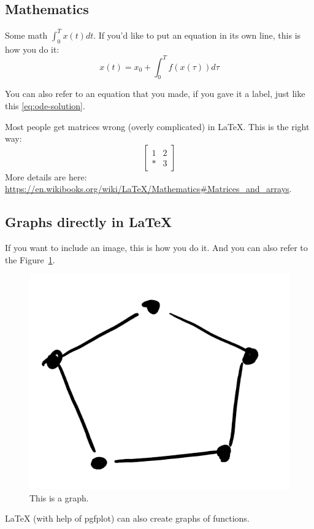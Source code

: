 \documentclass{amsart}
\begin{document}
\subsection{Mathematics}
Some math $\int_0^Tx(t)dt$. If you'd like to put an equation in its own line, this is how you do it:
\begin{equation}
x(t) = x_0 + \int_0^T f(x(\tau))d\tau  \label{eq:ode-solution}
\end{equation}


You can also refer to an equation that you made, if you gave it a label, just like this \eqref{eq:ode-solution}.


Most people get matrices wrong (overly complicated) in \LaTeX. This is the right way:
\[ %
  \begin{bmatrix}
    1 & 2 \\
    \ast & 3
  \end{bmatrix}
\]
More details are here:
\url{https://en.wikibooks.org/wiki/LaTeX/Mathematics\#Matrices_and_arrays}.

\subsection{Graphs directly in \LaTeX}

If you want to include an image, this is how you do it. And you can also refer to the Figure~\ref{fig:graph}.
\begin{figure}
  \centering
  \includegraphics[width=0.2\linewidth]{figs/graph.png}
  \caption{This is a graph.}\label{fig:graph}
\end{figure}

LaTeX (with help of pgfplot) can also create graphs of functions.
\begin{figure}[htb]\centering
 \end{figure}
 
\end{document}

